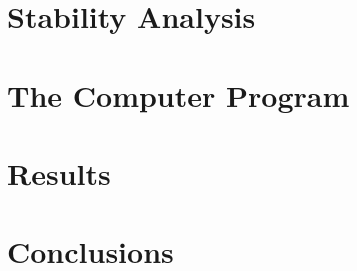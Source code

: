 \documentclass[11pt, a4paper]{article}
\begin{document}
\newpage

\section{Stability Analysis}
\newpage

\section{The Computer Program}
\newpage

\section{Results}
\newpage

\section{Conclusions}
\newpage
\end{document}
